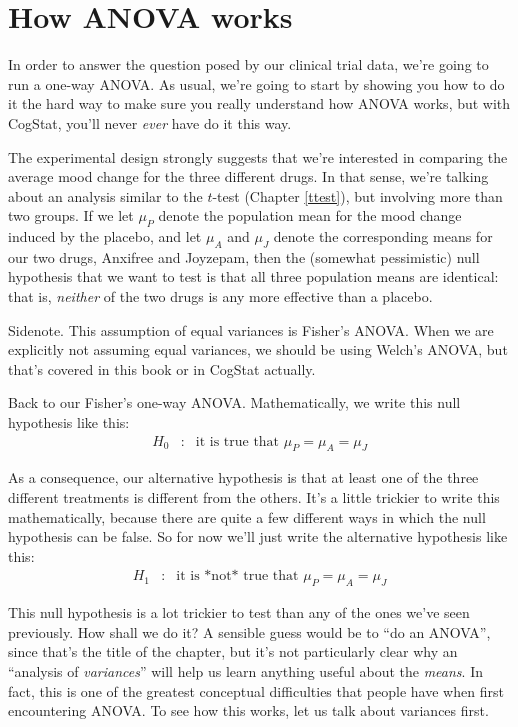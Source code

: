 \documentclass[
]{book}
\theoremstyle{definition}
\theoremstyle{definition}
\theoremstyle{definition}
\theoremstyle{definition}
\theoremstyle{remark}
\begin{document}
\hypertarget{anovaintro}{%
\section{How ANOVA works}\label{anovaintro}}

In order to answer the question posed by our clinical trial data, we're going to run a one-way ANOVA. As usual, we're going to start by showing you how to do it the hard way to make sure you really understand how ANOVA works, but with CogStat, you'll never \emph{ever} have do it this way.

The experimental design strongly suggests that we're interested in comparing the average mood change for the three different drugs. In that sense, we're talking about an analysis similar to the \(t\)-test (Chapter \ref{ttest}), but involving more than two groups. If we let \(\mu_P\) denote the population mean for the mood change induced by the placebo, and let \(\mu_A\) and \(\mu_J\) denote the corresponding means for our two drugs, Anxifree and Joyzepam, then the (somewhat pessimistic) null hypothesis that we want to test is that all three population means are identical: that is, \emph{neither} of the two drugs is any more effective than a placebo.

Sidenote. This assumption of equal variances is Fisher's ANOVA. When we are explicitly not assuming equal variances, we should be using Welch's ANOVA, but that's covered in this book or in CogStat actually.

Back to our Fisher's one-way ANOVA. Mathematically, we write this null hypothesis like this:
\[
\begin{array}{rcl}
{H}_{0} &:& \mbox{it is true that } \mu_P = \mu_A = \mu_J
\end{array}
\]

As a consequence, our alternative hypothesis is that at least one of the three different treatments is different from the others. It's a little trickier to write this mathematically, because there are quite a few different ways in which the null hypothesis can be false. So for now we'll just write the alternative hypothesis like this:
\[
\begin{array}{rcl}
{H}_{1} &:& \mbox{it is *not* true that } \mu_P = \mu_A = \mu_J
\end{array}
\]

This null hypothesis is a lot trickier to test than any of the ones we've seen previously. How shall we do it? A sensible guess would be to ``do an ANOVA'', since that's the title of the chapter, but it's not particularly clear why an ``analysis of \emph{variances}'' will help us learn anything useful about the \emph{means}. In fact, this is one of the greatest conceptual difficulties that people have when first encountering ANOVA. To see how this works, let us talk about variances first.
\end{document}
